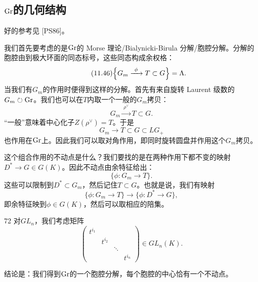 
\subsection{$\mathrm{Gr}$的几何结构}\label{sec:11-2-2}

好的参考见 [PS86]。

我们首先要考虑的是$\mathrm{Gr}$的 Morse 理论/Bialynicki-Birula 分解/胞腔分解。分解的胞腔由到极大环面的同态标号，这些同态构成余权格：
\begin{equation}\tag{11.46}
\Bigl\{G_m\xrightarrow{\ \phi\ }T\subset G\Bigr\}=\Lambda.
\end{equation}
当我们有$G_m$的作用时便得到这样的分解。首先有来自旋转 Laurent 级数的$G_m\circlearrowright\mathrm{Gr}$。我们也可以在$T$内取一个一般的$G_m$拷贝：
\begin{equation}\tag{11.47}
G_m\xrightarrow{\ \rho^{\vee}\ }T\subset G.
\end{equation}
“一般”意味着中心化子$Z(\rho^{\vee})=T$。于是
\begin{equation}\tag{11.48}
G_m\to T\subset G\subset LG_+
\end{equation}
也作用在$\mathrm{Gr}$上。因此我们可以取对角作用，即同时旋转圆盘并作用这个$G_m$拷贝。

这个组合作用的不动点是什么？我们要找的是在两种作用下都不变的映射$D^{*}\to G\in G(K)$。因此不动点由余特征给出：
\begin{equation}\tag{11.49}
\{\phi\colon G_m\to T\}.
\end{equation}
这些可以限制到$D^{*}\subset G_m$，然后记住$T\subset G$。也就是说，我们有映射
\begin{equation}\tag{11.50}
\{\phi\colon G_m\to T\}\longrightarrow\{\phi\colon D^{*}\to G\},
\end{equation}
即余特征映到$\phi\in G(K)$，然后可以取相应的陪集。

\begin{srcex}{72}
对$GL_n$，我们考虑矩阵
\begin{equation}\tag{11.51}
\begin{pmatrix}
t^{i_1} & & & \\
 & t^{i_2} & & \\
 & & \ddots & \\
 & & & t^{i_n}
\end{pmatrix}\in GL_n(K).
\end{equation}
\end{srcex}
结论是：我们得到$\mathrm{Gr}$的一个胞腔分解，每个胞腔的中心恰有一个不动点。

